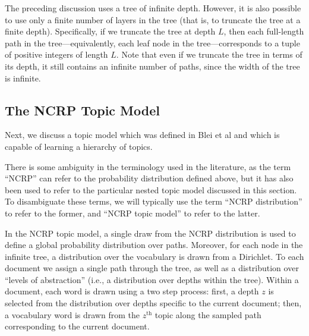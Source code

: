 \documentclass{article}
\newcommand{\nth}{^{\text{th}}}
\begin{document}
The preceding discussion uses a tree of infinite depth.
However, it is also possible to use only a finite number of layers in the tree (that is, to truncate the tree at a finite depth).
Specifically, if we truncate the tree at depth $L$, then each full-length path in the tree---equivalently, each leaf node in the tree---corresponds to a tuple of positive integers of length $L$.
Note that even if we truncate the tree in terms of its depth, it still contains an infinite number of paths, since the width of the tree is infinite.

\subsection{The NCRP Topic Model}

Next, we discuss a topic model which was defined in Blei et al \cite{blei2010ncrp} and which is capable of learning a hierarchy of topics.

There is some ambiguity in the terminology used in the literature, as the term ``NCRP'' can refer to the probability distribution defined above, but it has also been used to refer to the particular nested topic model discussed in this section.
To disambiguate these terms, we will typically use the term ``NCRP distribution'' to refer to the former, and ``NCRP topic model'' to refer to the latter.

In the NCRP topic model, a single draw from the NCRP distribution is used to define a global probability distribution over paths.
Moreover, for each node in the infinite tree, a distribution over the vocabulary is drawn from a Dirichlet.
To each document we assign a single path through the tree, as well as a distribution over ``levels of abstraction'' (i.e., a distribution over depths within the tree).
Within a document, each word is drawn using a two step process: first, a depth $z$ is selected from the distribution over depths specific to the current document; then, a vocabulary word is drawn from the $z\nth$ topic along the sampled path corresponding to the current document.
\end{document}
